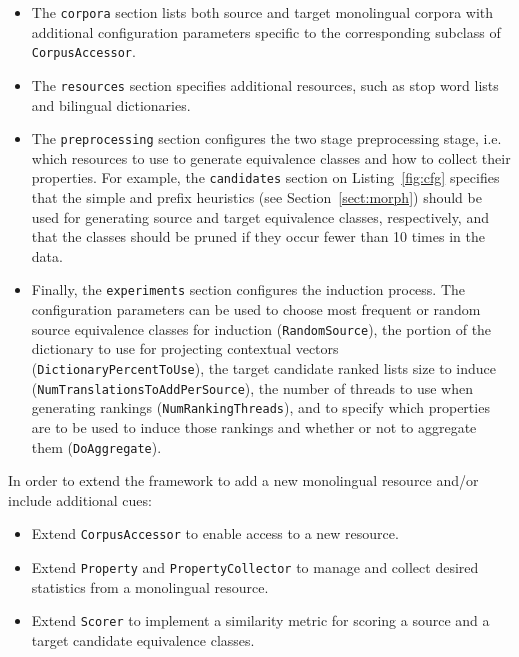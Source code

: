 \documentclass{article}
\newcommand{\secref}[1]{Section~\ref{#1}}
\newcommand{\lstref}[1]{Listing~\ref{#1}}
\begin{document}
\begin{itemize}
  \item The \small{\tt  corpora} section lists both source and target monolingual corpora with additional configuration parameters specific to the corresponding subclass of \small{\tt CorpusAccessor}.
  \item The \small{\tt  resources} section specifies additional resources, such as stop word lists and bilingual dictionaries.
  \item The \small{\tt  preprocessing} section configures the two stage preprocessing stage, i.e. which resources to use to generate equivalence classes and how to collect their properties.  For example, the \small{\tt  candidates} section on \lstref{fig:cfg} specifies that the simple and prefix heuristics (see \secref{sect:morph}) should be used for generating source and target equivalence classes, respectively, and that the classes should be pruned if they occur fewer than 10 times in the data.
  \item Finally, the \small{\tt experiments} section configures the induction process.  The configuration parameters can be used to choose most frequent or random source equivalence classes for induction (\small{\tt RandomSource}), the portion of the dictionary to use for projecting contextual vectors (\small{\tt DictionaryPercentToUse}), the target candidate ranked lists size to induce  (\small{\tt NumTranslationsToAddPerSource}), the number of threads to use when generating rankings (\small{\tt NumRankingThreads}), and to specify which properties are to be used to induce those rankings and whether or not to aggregate them (\small{\tt DoAggregate}).\\
\end{itemize}

In order to extend the framework to add a new monolingual resource and/or include additional cues:

\begin{itemize}
  \item Extend \small{\tt CorpusAccessor} to enable access to a new resource.
  \item Extend \small{\tt Property} and \small{\tt PropertyCollector} to manage and collect desired statistics from a monolingual resource.
  \item Extend \small{\tt Scorer} to implement a similarity metric for scoring a source and a target candidate equivalence classes.
\end{itemize}
\end{document}
